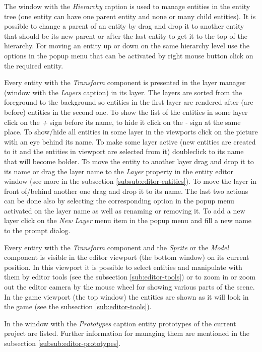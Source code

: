 The window with the \emph{Hierarchy} caption is used to manage entities in the entity tree (one entity can have one parent entity and none or many child entities). It is possible to change a parent of an entity by drag and drop it to another entity that should be its new parent or after the last entity to get it to the top of the hierarchy. For moving an entity up or down on the same hierarchy level use the options in the popup menu that can be activated by right mouse button click on the required entity.

Every entity with the \emph{Transform} component is presented in the layer manager (window with the \emph{Layers} caption) in its layer. The layers are sorted from the foreground to the background so entities in the first layer are rendered after (are before) entities in the second one. To show the list of the entities in some layer click on the \emph{+} sign before its name, to hide it click on the \emph{-} sign at the same place. To show/hide all entities in some layer in the viewports click on the picture with an eye behind its name. To make some layer active (new entities are created to it and the entities in viewport are selected from it) doubleclick to its name that will become bolder. To move the entity to another layer drag and drop it to its name or drag the layer name to the \emph{Layer} property in the entity editor window (see more in the subsection \ref{subsub:editor-entities}). To move the layer in front of/behind another one drag and drop it to its name. The last two actions can be done also by selecting the corresponding option in the popup menu activated on the layer name as well as renaming or removing it. To add a new layer click on the \emph{New Layer} menu item in the popup menu and fill a new name to the prompt dialog.

Every entity with the \emph{Transform} component and the \emph{Sprite} or the \emph{Model} component is visible in the editor viewport (the bottom window) on its current position. In this viewport it is possible to select entities and manipulate with them by editor tools (see the subsection \ref{sub:editor-tools}) or to zoom in or zoom out the editor camera by the mouse wheel for showing various parts of the scene. In the game viewport (the top window) the entities are shown as it will look in the game (see the subsection \ref{sub:editor-tools}).

In the window with the \emph{Prototypes} caption entity prototypes of the current project are listed. Further information for managing them are mentioned in the subsection \ref{subsub:editor-prototypes}.

